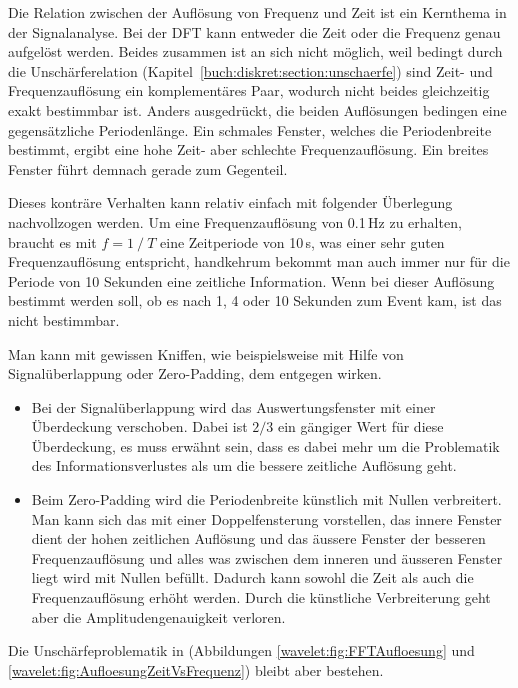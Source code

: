 Die Relation zwischen der Auflösung von Frequenz und Zeit ist ein
Kernthema in der Signalanalyse.
Bei der DFT kann entweder die Zeit oder die Frequenz genau aufgelöst
werden.
Beides zusammen ist an sich nicht möglich, weil bedingt durch die
Unschärferelation (Kapitel~\ref{buch:diskret:section:unschaerfe})
%
sind Zeit- und Frequenzauflösung ein komplementäres Paar, wodurch
nicht beides gleichzeitig exakt bestimmbar ist.
Anders ausgedrückt, die beiden Auflösungen bedingen
eine gegensätzliche Periodenlänge.
Ein schmales Fenster, welches die Periodenbreite bestimmt, ergibt
eine hohe Zeit- aber schlechte Frequenzauflösung.
Ein breites Fenster führt demnach gerade zum Gegenteil.

Dieses konträre Verhalten kann relativ einfach mit folgender
Überlegung nachvollzogen werden.
Um eine Frequenzauflösung von 0.1\,Hz zu erhalten, braucht
es mit $f=1⁄T$ eine Zeitperiode von 10\,s, was einer sehr guten
Frequenzauflösung entspricht, handkehrum bekommt man auch immer nur
für die Periode von 10 Sekunden eine zeitliche Information. Wenn
bei dieser Auflösung bestimmt werden soll, ob es nach 1, 4 oder 10
Sekunden zum Event kam, ist das nicht bestimmbar.
 
Man kann mit gewissen Kniffen, wie beispielsweise mit Hilfe von
Signalüberlappung oder Zero-Padding, dem entgegen wirken.
%
\begin{itemize}
	\item Bei der Signalüberlappung wird das Auswertungsfenster
	mit einer Überdeckung verschoben. Dabei ist $2/3$ ein
	gängiger Wert für diese Überdeckung, es muss erwähnt sein,
	dass es dabei mehr um die Problematik des Informationsverlustes
	als um die bessere zeitliche Auflösung geht.
	\item Beim Zero-Padding wird die Periodenbreite künstlich
	mit Nullen verbreitert.
	Man kann sich das mit einer Doppelfensterung vorstellen,
	das innere Fenster dient der hohen zeitlichen Auflösung und
	das äussere Fenster der besseren Frequenzauflösung und alles
	was zwischen dem inneren und äusseren Fenster liegt wird
	mit Nullen befüllt.
	Dadurch kann sowohl die Zeit als auch die Frequenzauflösung erhöht
	werden.
	Durch die künstliche Verbreiterung geht aber die
	Amplitudengenauigkeit verloren.
\end{itemize}
Die Unschärfeproblematik in (Abbildungen \ref{wavelet:fig:FFTAufloesung}
und \ref{wavelet:fig:AufloesungZeitVsFrequenz}) bleibt aber bestehen.

